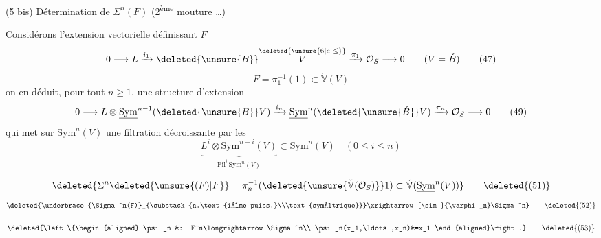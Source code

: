 (\uline{5 bis}) \uline{Détermination de} $\Sigma^n(F)$ (2\textsuperscript{ème} mouture \ldots)

Considérons l'extension vectorielle définissant $F$ 
\[
0\longrightarrow L\xrightarrow{i_1}\deleted{\unsure{B}}\overset{\deleted{\unsure{6|e|\leq}}}{V}\xrightarrow{\pi_1}\mathcal O_S\longrightarrow0 \qquad (V=\check B) \tag*{(47)}
\]
\[
 F=\pi_1^{-1}(1)\subset\check{\mathbb V}(V) \tag*{(48)}
\]
on en déduit, pour tout $n\geq1$, une structure
d'extension
\[
0\longrightarrow L\otimes\underline{\mathrm{Sym}}^{n-1}(\deleted{\unsure{B}}V)\xrightarrow{i_n}\underline{\mathrm{Sym}}^n(\deleted{\unsure{\check B}}V)\xrightarrow{\pi_n}\mathcal O_S\longrightarrow0 \tag*{(49)}
\]
qui  met sur $\mathrm{Sym}^n(V)$ une filtration
 décroissante par les
\[
\underbrace{L^i\otimes\underline{\mathrm{Sym}}^{n-i}(V)}_{\mathrm{Fil}^i\,\mathrm{Sym}^n(V)}\subset\underline{\mathrm{Sym}}^n(V)\quad(0\leq i\leq n) \tag*{(50)}
\]

\[
\deleted{\Sigma^n\deleted{\unsure{(F)|F}}=\pi_n^{-1}(\deleted{\unsure{\check{\mathbb V}(\mathcal O_S)}}1)\subset\check{\mathbb V}(\underline{\mathrm{Sym}}^n(V))} \tag*{\deleted{(51)}}
\]
\[
\deleted{\underbrace{\Sigma^n(F)}_{\substack{n.\text{ième puiss.}\\\text{symétrique}}}\xrightarrow[\sim]{\varphi_n}\Sigma^n} \tag*{\deleted{(52)}}
\]

\[
\deleted{\left\{\begin{aligned}
 \psi_n &: F^n\longrightarrow\Sigma^n\\
 \psi_n(x_1,\ldots,x_n)&=x_1
\end{aligned}\right.} \tag*{\deleted{(53)}}
\]
